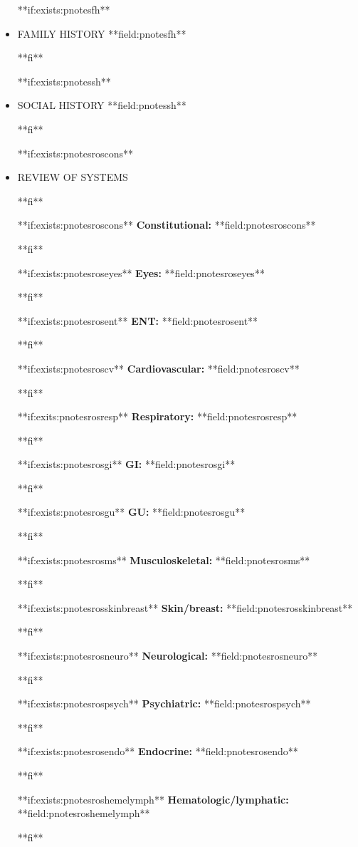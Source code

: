 \documentclass{article}
\newcommand{\sheading}[1]{\textbf{#1:}}
\begin{document}
\begin{itemize}
**if:exists:pnotesfh**
\
\item{FAMILY HISTORY} **field:pnotesfh**
\par
**fi**

**if:exists:pnotessh**
\
\item{SOCIAL HISTORY} **field:pnotessh**
\par
**fi**

**if:exists:pnotesroscons**
\
\item{REVIEW OF SYSTEMS} 
\par
**fi**

**if:exists:pnotesroscons**
\sheading{Constitutional} **field:pnotesroscons**
\par
**fi**

**if:exists:pnotesroseyes**
\sheading{Eyes} **field:pnotesroseyes**
\par
**fi**

**if:exists:pnotesrosent**
\sheading{ENT} **field:pnotesrosent**
\par
**fi**

**if:exists:pnotesroscv**
\sheading{Cardiovascular} **field:pnotesroscv**
\par
**fi**

**if:exits:pnotesrosresp**
\sheading{Respiratory}  **field:pnotesrosresp**
\par
**fi**

**if:exists:pnotesrosgi**
\sheading{GI} **field:pnotesrosgi**
\par
**fi**

**if:exists:pnotesrosgu**
\sheading{GU} **field:pnotesrosgu**
\par
**fi**

**if:exists:pnotesrosms**
\sheading{Musculoskeletal} **field:pnotesrosms**
\par
**fi**

**if:exists:pnotesrosskinbreast**
\sheading{Skin/breast} **field:pnotesrosskinbreast**
\par
**fi**

**if:exists:pnotesrosneuro**
\sheading{Neurological} **field:pnotesrosneuro**
\par
**fi**

**if:exists:pnotesrospsych**
\sheading{Psychiatric} **field:pnotesrospsych**
\par
**fi**

**if:exists:pnotesrosendo**
\sheading{Endocrine} **field:pnotesrosendo**
\par
**fi**

**if:exists:pnotesroshemelymph**
\sheading{Hematologic/lymphatic} **field:pnotesroshemelymph**
\par
**fi**


\end{itemize}
\end{document}
